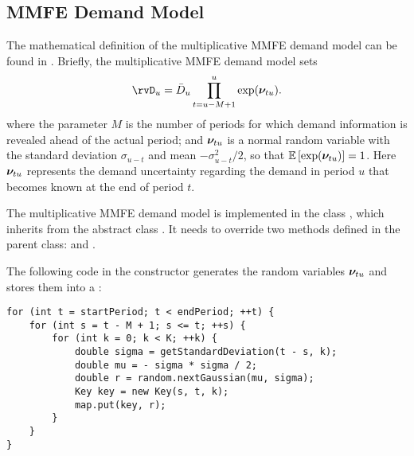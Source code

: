 \subsection{MMFE Demand Model}

The mathematical definition of the multiplicative MMFE demand model
can be found in \citet{heath-jackson-1994}.
Briefly, the multiplicative MMFE demand model sets
\[
    \rvD_u
  =
    \bar{D}_u \prod_{t=u-M+1}^u \exp(\rvnu_{tu}).
\]
where the parameter $M$ is the number of periods
for which demand information is revealed ahead of the actual period;
and $\bm{\nu}_{tu}$ is a normal random variable
with the standard deviation $\sigma_{u-t}$
and mean $-\sigma_{u-t}^2 / 2$,
so that $\mathbb{E}\left[\exp(\bm{\nu}_{tu})\right] = 1$.
Here $\bm{\nu}_{tu}$ represents the demand uncertainty
regarding the demand in period $u$
that becomes known at the end of period $t$.

The multiplicative MMFE demand model
is implemented in the class ,
which inherits from the abstract class
.
It needs to override two methods defined in the parent class:
 and .

The following code in the constructor
generates the random variables $\bm{\nu}_{tu}$
and stores them into a :
\begin{lstlisting}
for (int t = startPeriod; t < endPeriod; ++t) {
    for (int s = t - M + 1; s <= t; ++s) {
        for (int k = 0; k < K; ++k) {
            double sigma = getStandardDeviation(t - s, k);
            double mu = - sigma * sigma / 2;
            double r = random.nextGaussian(mu, sigma);
            Key key = new Key(s, t, k);
            map.put(key, r);
        }
    }
}
\end{lstlisting}

